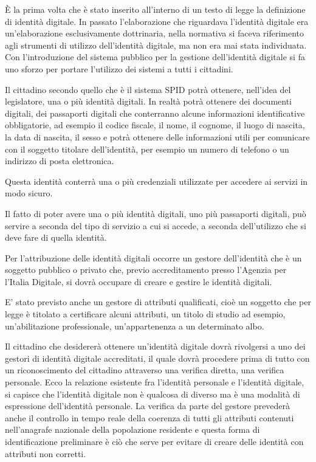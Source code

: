 È la prima volta che è stato inserito all'interno di un testo di legge la definizione di identità digitale. In passato l'elaborazione che riguardava l'identità digitale era un'elaborazione esclusivamente dottrinaria, nella normativa si faceva riferimento  agli strumenti di utilizzo dell'identità digitale, ma non era mai stata individuata. Con l'introduzione del sistema pubblico per la gestione dell'identità digitale si fa uno sforzo per portare l'utilizzo dei sistemi a tutti i cittadini.

Il cittadino secondo quello che è il sistema SPID potrà ottenere, nell'idea del legislatore, una o più identità digitali. In realtà potrà ottenere dei documenti digitali, dei passaporti digitali che conterranno alcune informazioni identificative obbligatorie, ad esempio il codice fiscale, il nome, il cognome, il luogo di nascita, la data di nascita, il sesso e potrà ottenere delle informazioni utili per comunicare con il soggetto titolare dell'identità, per esempio un numero di telefono o un indirizzo di posta elettronica.

Questa identità conterrà una o più credenziali utilizzate per accedere ai servizi in modo sicuro.

Il fatto di poter avere una o più identità digitali, uno più passaporti digitali, può servire a seconda del tipo di servizio a cui si accede, a seconda dell'utilizzo che si deve fare di quella identità.

Per l'attribuzione delle identità digitali occorre un gestore dell'identità che è un soggetto pubblico o privato che, previo accreditamento presso l'Agenzia per l'Italia Digitale, si dovrà occupare di creare e gestire le identità digitali.

E' stato previsto anche un gestore di attributi qualificati, cioè un soggetto che per legge è titolato a certificare alcuni attributi, un titolo di studio ad esempio, un'abilitazione professionale, un'appartenenza a un determinato albo.  

Il cittadino che desidererà ottenere un'identità digitale dovrà rivolgersi a uno dei gestori di identità digitale accreditati, il quale dovrà procedere prima di tutto con un riconoscimento del cittadino attraverso una verifica diretta, una verifica personale. Ecco la relazione esistente fra l'identità personale e l'identità digitale, si capisce che l'identità digitale non è qualcosa di diverso ma è una modalità di espressione dell'identità personale. La verifica da parte del gestore prevederà anche il controllo in tempo reale della coerenza di tutti gli attributi contenuti nell'anagrafe nazionale della popolazione residente e questa forma di identificazione preliminare è ciò che serve per evitare di creare delle identità con attributi non corretti.

